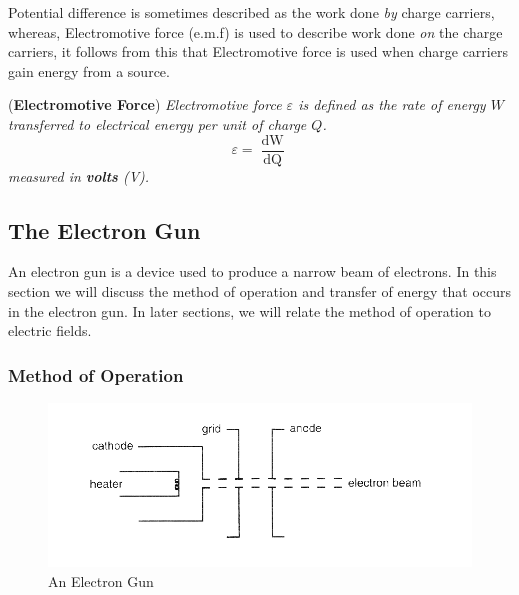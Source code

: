 Potential difference is sometimes described as the work done \textit{by} charge carriers, whereas, Electromotive force (e.m.f) is used to describe work done \textit{on} the charge carriers, it follows from this that Electromotive force is used when charge carriers gain energy from a source.

\begin{definition}{(\textbf{Electromotive Force})}
\textit{Electromotive force $\varepsilon$ is defined as the rate of energy $W$ transferred to electrical energy per unit of charge $Q$.}
\begin{equation}
    \varepsilon = \frac{\mathop{\mathrm{d}W}}{\mathop{\mathrm{d}Q}}
\end{equation}
\textit{measured in \textbf{volts} (V).}
\end{definition}

\subsection{The Electron Gun}

An electron gun is a device used to produce a narrow beam of electrons. In this section we will discuss the method of operation and transfer of energy that occurs in the electron gun. In later sections, we will relate the method of operation to electric fields. 

\subsubsection{Method of Operation}

\begin{figure}[h!]
    \centering
    \includegraphics[scale=1.5]{notes/images/Electron-Gun.JPG}
    \caption{An Electron Gun}
\end{figure}
\FloatBarrier

